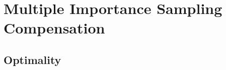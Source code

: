 \chapter{Multiple Importance Sampling Compensation}
\label{ch:mis_compensation}



\section{Optimality}
\label{sec:misc_optimality}

